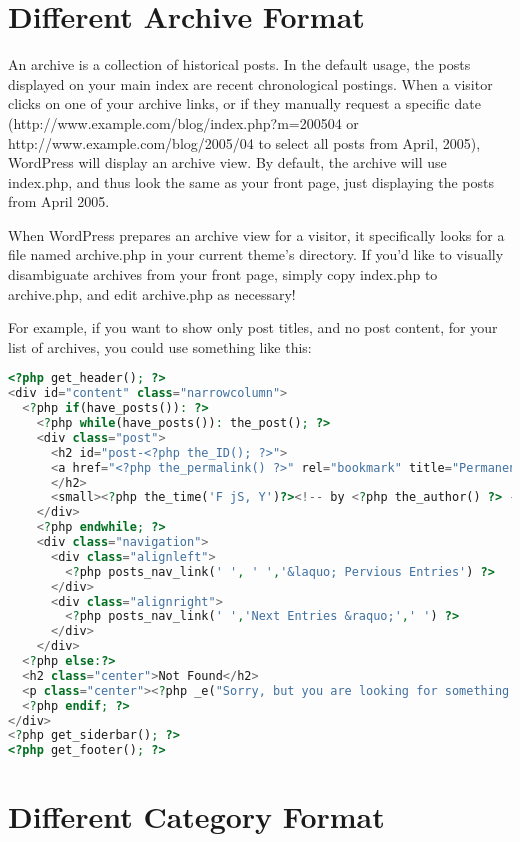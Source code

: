\section{Different Archive Format}

An archive is a collection of historical posts. In the default usage, the posts displayed on your main index are recent chronological postings. When a visitor clicks on one of your archive links, or if they manually request a specific date (http://www.example.com/blog/index.php?m=200504 or http://www.example.com/blog/2005/04 to select all posts from April, 2005), WordPress will display an archive view. By default, the archive will use index.php, and thus look the same as your front page, just displaying the posts from April 2005.



When WordPress prepares an archive view for a visitor, it specifically looks for a file named archive.php in your current theme's directory. If you'd like to visually disambiguate archives from your front page, simply copy index.php to archive.php, and edit archive.php as necessary!

For example, if you want to show only post titles, and no post content, for your list of archives, you could use something like this:

\begin{lstlisting}[language=PHP]
<?php get_header(); ?>
<div id="content" class="narrowcolumn">
  <?php if(have_posts()): ?>
    <?php while(have_posts()): the_post(); ?>
    <div class="post">
      <h2 id="post-<?php the_ID(); ?>">
      <a href="<?php the_permalink() ?>" rel="bookmark" title="Permanent link to <?php the_title(); ?>"><?php the_title(); ?></a>
      </h2>
      <small><?php the_time('F jS, Y')?><!-- by <?php the_author() ?> --></small>
    </div>
    <?php endwhile; ?>
    <div class="navigation">
      <div class="alignleft">
        <?php posts_nav_link(' ', ' ','&laquo; Pervious Entries') ?>
      </div>
      <div class="alignright">
        <?php posts_nav_link(' ','Next Entries &raquo;',' ') ?>
      </div>
    </div>
  <?php else:?>
  <h2 class="center">Not Found</h2>
  <p class="center"><?php _e("Sorry, but you are looking for something that isn't here."); ?></p>
  <?php endif; ?>
</div>
<?php get_siderbar(); ?>
<?php get_footer(); ?>
\end{lstlisting}

\section{Different Category Format}

